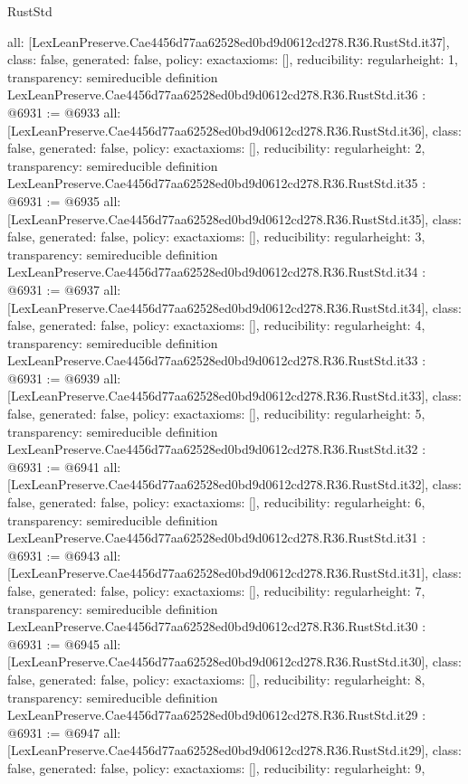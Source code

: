 \begin{lexlean}{RustStd}
\begin{coremodule}
{  all: [LexLeanPreserve.Cae4456d77aa62528ed0bd9d0612cd278.R36.RustStd.it37],
  class: false,
  generated: false,
  policy: exact{axioms: []},
  reducibility: regular{height: 1},
  transparency: semireducible
}
definition LexLeanPreserve.Cae4456d77aa62528ed0bd9d0612cd278.R36.RustStd.it36 : @6931 := @6933 {
  all: [LexLeanPreserve.Cae4456d77aa62528ed0bd9d0612cd278.R36.RustStd.it36],
  class: false,
  generated: false,
  policy: exact{axioms: []},
  reducibility: regular{height: 2},
  transparency: semireducible
}
definition LexLeanPreserve.Cae4456d77aa62528ed0bd9d0612cd278.R36.RustStd.it35 : @6931 := @6935 {
  all: [LexLeanPreserve.Cae4456d77aa62528ed0bd9d0612cd278.R36.RustStd.it35],
  class: false,
  generated: false,
  policy: exact{axioms: []},
  reducibility: regular{height: 3},
  transparency: semireducible
}
definition LexLeanPreserve.Cae4456d77aa62528ed0bd9d0612cd278.R36.RustStd.it34 : @6931 := @6937 {
  all: [LexLeanPreserve.Cae4456d77aa62528ed0bd9d0612cd278.R36.RustStd.it34],
  class: false,
  generated: false,
  policy: exact{axioms: []},
  reducibility: regular{height: 4},
  transparency: semireducible
}
definition LexLeanPreserve.Cae4456d77aa62528ed0bd9d0612cd278.R36.RustStd.it33 : @6931 := @6939 {
  all: [LexLeanPreserve.Cae4456d77aa62528ed0bd9d0612cd278.R36.RustStd.it33],
  class: false,
  generated: false,
  policy: exact{axioms: []},
  reducibility: regular{height: 5},
  transparency: semireducible
}
definition LexLeanPreserve.Cae4456d77aa62528ed0bd9d0612cd278.R36.RustStd.it32 : @6931 := @6941 {
  all: [LexLeanPreserve.Cae4456d77aa62528ed0bd9d0612cd278.R36.RustStd.it32],
  class: false,
  generated: false,
  policy: exact{axioms: []},
  reducibility: regular{height: 6},
  transparency: semireducible
}
definition LexLeanPreserve.Cae4456d77aa62528ed0bd9d0612cd278.R36.RustStd.it31 : @6931 := @6943 {
  all: [LexLeanPreserve.Cae4456d77aa62528ed0bd9d0612cd278.R36.RustStd.it31],
  class: false,
  generated: false,
  policy: exact{axioms: []},
  reducibility: regular{height: 7},
  transparency: semireducible
}
definition LexLeanPreserve.Cae4456d77aa62528ed0bd9d0612cd278.R36.RustStd.it30 : @6931 := @6945 {
  all: [LexLeanPreserve.Cae4456d77aa62528ed0bd9d0612cd278.R36.RustStd.it30],
  class: false,
  generated: false,
  policy: exact{axioms: []},
  reducibility: regular{height: 8},
  transparency: semireducible
}
definition LexLeanPreserve.Cae4456d77aa62528ed0bd9d0612cd278.R36.RustStd.it29 : @6931 := @6947 {
  all: [LexLeanPreserve.Cae4456d77aa62528ed0bd9d0612cd278.R36.RustStd.it29],
  class: false,
  generated: false,
  policy: exact{axioms: []},
  reducibility: regular{height: 9},
}
\end{coremodule}
\end{lexlean}
